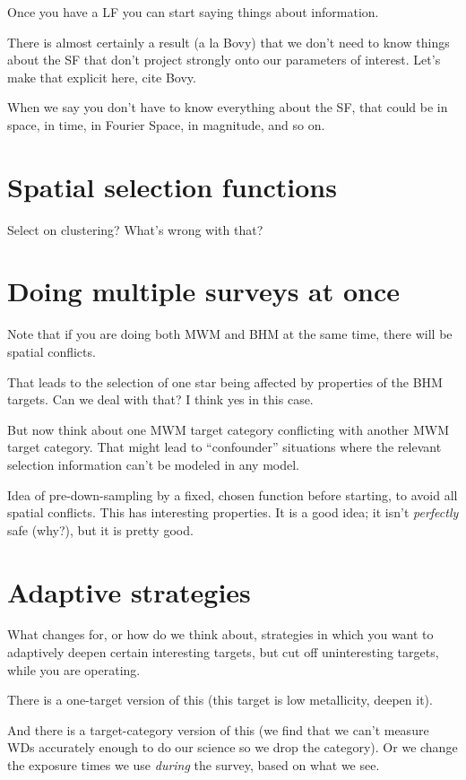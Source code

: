 \documentclass[modern]{aastex62}
\begin{document}
Once you have a LF you can start saying things about information.

There is almost certainly a result (a la Bovy) that we don't need to know
things about the SF that don't project strongly onto our parameters of interest.
Let's make that explicit here, cite Bovy.

When we say you don't have to know everything about the SF, that could be
in space, in time, in Fourier Space, in magnitude, and so on.

\section{Spatial selection functions}

Select on clustering? What's wrong with that?

\section{Doing multiple surveys at once}

Note that if you are doing both MWM and BHM at the same time, there will be
spatial conflicts.

That leads to the selection of one star being affected by properties of the
BHM targets. Can we deal with that? I think yes in this case.

But now think about one MWM target category conflicting with another MWM target
category. That might lead to ``confounder'' situations where the relevant selection
information can't be modeled in any model.

Idea of pre-down-sampling by a fixed, chosen function before starting, to avoid
all spatial conflicts. This has interesting properties. It is a good idea; it isn't
\emph{perfectly} safe (why?), but it is pretty good.

\section{Adaptive strategies}

What changes for, or how do we think about, strategies in which you want to
adaptively deepen certain interesting targets, but cut off uninteresting targets,
while you are operating.

There is a one-target version of this (this target is low metallicity, deepen it).

And there is a target-category version of this (we find that we can't measure WDs
accurately enough to do our science so we drop the category). Or we change the exposure
times we use \emph{during} the survey, based on what we see.
\end{document}
